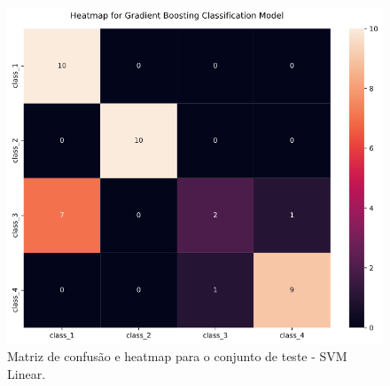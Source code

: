 \documentclass[
	article,			%
	11pt,				%
	oneside,			%
	a4paper,			%
	english,			%
	brazil,				%
	sumario=tradicional
	]{abntex2}
\begin{document}
\begin{figure}[H]
 \centering
 \includegraphics[scale=0.5]{fig/svm_cm.png}
 \caption{Matriz de confusão e heatmap para o conjunto de teste - SVM Linear.}
 \label{fig:svm_cm}
\end{figure}
\end{document}
